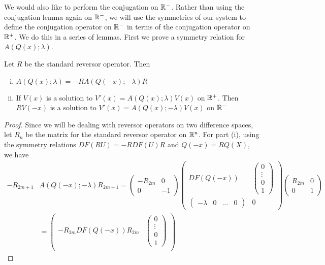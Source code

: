\documentclass[thesis.tex]{subfiles}
\begin{document}
We would also like to perform the conjugation on $\mathbb{R}^-$. Rather than using the conjugation lemma again on $\mathbb{R}^-$, we will use the symmetries of our system to define the conjugation operator on $\mathbb{R}^-$ in terms of the conjugation operator on $\mathbb{R}^+$. We do this in a series of lemmas. First we prove a symmetry relation for $A(Q(x); \lambda)$.

\begin{lemma}\label{AQxsymmetrylemma}
Let $R$ be the standard reversor operator. Then
\begin{enumerate}[(i)]
\item $A(Q(x); \lambda) = -R A(Q(-x); -\lambda)R$
\item If $V(x)$ is a solution to $V'(x) = A(Q(x); \lambda) V(x)$ on $\mathbb{R}^+$. Then $R V(-x)$ is a solution to $V'(x) = A(Q(x); -\lambda) V(x)$ on $\mathbb{R}^-$
\end{enumerate}
\begin{proof}
Since we will be dealing with reversor operators on two difference spaces, let $R_{n}$ be the matrix for the standard reversor operator on $\mathbb{R}^n$. For part (i), using the symmetry relations $DF(RU) = -RDF(U)R$ and $Q(-x) = RQ(X)$, we have
\begin{align*}
-R_{2m+1} &A(Q(-x); -\lambda) R_{2m+1}
= \begin{pmatrix}-R_{2m} & 0 \\ 0 & -1 \end{pmatrix} 
\begin{pmatrix}
DF(Q(-x)) & \begin{pmatrix} 0 \\ \vdots \\ 0 \\ 1 \end{pmatrix} \\
\begin{pmatrix} -\lambda & 0 & \dots & 0 \end{pmatrix} & 0
\end{pmatrix} \begin{pmatrix}R_{2m} & 0 \\ 0 & 1 \end{pmatrix} \\
&= \begin{pmatrix}
-R_{2m} DF(Q(-x)) R_{2m} & \begin{pmatrix} 0 \\ \vdots \\ 0 \\ 1 \end{pmatrix} \\

\end{pmatrix}
\end{align*}
\end{proof}
\end{lemma}
\end{document}
